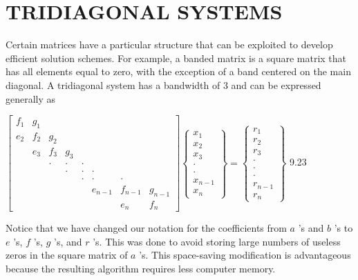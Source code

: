 \documentclass[../main.tex]{subfiles}
\begin{document}
\section{TRIDIAGONAL SYSTEMS}
\label{sec:sec_8_4}

Certain matrices have a particular structure that can be exploited to develop efficient solution schemes. For example, a banded matrix is a square matrix that has all elements equal to zero, with the exception of a band centered on the main diagonal.
A tridiagonal system has a bandwidth of 3 and can be expressed generally as
\bigskip

$\left[\begin{array}{cccccccc}f_{1} & g_{1} & & & & & & \\ e_{2} & f_{2} & g_{2} & & & & & \\ & e_{3} & f_{3} & g_{3} & & & & \\ & & \cdot & \cdot & \cdot & & & \\ & & & \cdot & \cdot & \cdot & & \\ & & & & \cdot & \cdot & \cdot & \\ & & & & & e_{n-1} & f_{n-1} & g_{n-1} \\ & & & & & & e_{n} & f_{n}\end{array}\right]\left\{\begin{array}{c}x_{1} \\ x_{2} \\ x_{3} \\ \cdot \\ \cdot \\ x_{n-1} \\ x_{n}\end{array}\right\}=\left\{\begin{array}{c}r_{1} \\ r_{2} \\ r_{3} \\ \cdot \\ \cdot \\ \cdot \\ r_{n-1} \\ r_{n}\end{array}\right\}$ \hfill{9.23}

\bigskip
Notice that we have changed our notation for the coefficients from $a$ 's and $b$ 's to $e$ 's, $f$ 's, $g$ 's, and $r$ 's. This was done to avoid storing large numbers of useless zeros in the square matrix of $a$ 's. This space-saving modification is advantageous because the resulting algorithm requires less computer memory.
\end{document}
